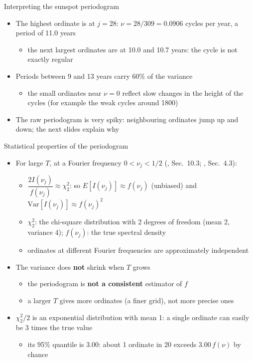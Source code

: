 \begin{frame}{Interpreting the sunspot periodogram}
\itemsize{\small}
\begin{itemize}
    \item The highest ordinate is at $j = 28$: $\nu = 28/309 = 0.0906$ cycles per year, a period of 11.0 years
    \begin{itemize}
        \item the next largest ordinates are at 10.0 and 10.7 years: the cycle is not exactly regular
    \end{itemize}
    \item Periods between 9 and 13 years carry 60\% of the variance
    \begin{itemize}
        \item the small ordinates near $\nu = 0$ reflect slow changes in the height of the cycles (for example the weak cycles around 1800)
    \end{itemize}
    \item The raw periodogram is very spiky: neighbouring ordinates jump up and down; the next slides explain why
\end{itemize}
\end{frame}

\begin{frame}{Statistical properties of the periodogram}
\itemsize{\footnotesize}
\begin{itemize}
    \item For large $T$, at a Fourier frequency $0 < \nu_j < 1/2$ (, Sec.~10.3; , Sec.~4.3):
    \begin{itemize}
        \item $\dfrac{2I(\nu_j)}{f(\nu_j)} \approx \chi^2_2$: so $E[I(\nu_j)] \approx f(\nu_j)$ (unbiased) and $\mathrm{Var}[I(\nu_j)] \approx f(\nu_j)^2$
        \item $\chi^2_2$: the chi-square distribution with 2 degrees of freedom (mean 2, variance 4); $f(\nu_j)$: the true spectral density
        \item ordinates at different Fourier frequencies are approximately independent
    \end{itemize}
    \item The variance does \textbf{not} shrink when $T$ grows
    \begin{itemize}
        \item the periodogram is \textbf{not a consistent} estimator of $f$
        \item a larger $T$ gives more ordinates (a finer grid), not more precise ones
    \end{itemize}
    \item $\chi^2_2/2$ is an exponential distribution with mean 1: a single ordinate can easily be 3 times the true value
    \begin{itemize}
        \item its 95\% quantile is 3.00: about 1 ordinate in 20 exceeds $3.00\,f(\nu)$ by chance
    \end{itemize}
\end{itemize}
\end{frame}

